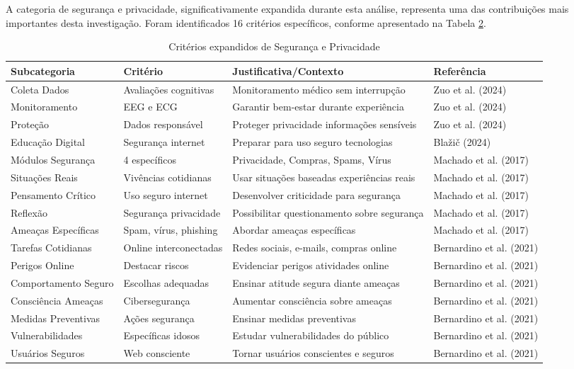 \begin{table}[H]
A categoria de segurança e privacidade, significativamente expandida durante esta análise, representa uma das contribuições mais importantes desta investigação. Foram identificados 16 critérios específicos, conforme apresentado na Tabela \ref{tab:seguranca_expandida}.

\begin{table}[H]
\centering
\caption{Critérios expandidos de Segurança e Privacidade}
\label{tab:seguranca_expandida}
\begin{tabular}{p{2.5cm}p{3.5cm}p{4.5cm}p{2.5cm}}
\hline
\textbf{Subcategoria} & \textbf{Critério} & \textbf{Justificativa/Contexto} & \textbf{Referência} \\ \hline
Coleta Dados & Avaliações cognitivas & Monitoramento médico sem interrupção & Zuo et al. (2024) \\
Monitoramento & EEG e ECG & Garantir bem-estar durante experiência & Zuo et al. (2024) \\
Proteção & Dados responsável & Proteger privacidade informações sensíveis & Zuo et al. (2024) \\
Educação Digital & Segurança internet & Preparar para uso seguro tecnologias & Blažič (2024) \\
Módulos Segurança & 4 específicos & Privacidade, Compras, Spams, Vírus & Machado et al. (2017) \\
Situações Reais & Vivências cotidianas & Usar situações baseadas experiências reais & Machado et al. (2017) \\
Pensamento Crítico & Uso seguro internet & Desenvolver criticidade para segurança & Machado et al. (2017) \\
Reflexão & Segurança privacidade & Possibilitar questionamento sobre segurança & Machado et al. (2017) \\
Ameaças Específicas & Spam, vírus, phishing & Abordar ameaças específicas & Machado et al. (2017) \\
Tarefas Cotidianas & Online interconectadas & Redes sociais, e-mails, compras online & Bernardino et al. (2021) \\
Perigos Online & Destacar riscos & Evidenciar perigos atividades online & Bernardino et al. (2021) \\
Comportamento Seguro & Escolhas adequadas & Ensinar atitude segura diante ameaças & Bernardino et al. (2021) \\
Consciência Ameaças & Cibersegurança & Aumentar consciência sobre ameaças & Bernardino et al. (2021) \\
Medidas Preventivas & Ações segurança & Ensinar medidas preventivas & Bernardino et al. (2021) \\
Vulnerabilidades & Específicas idosos & Estudar vulnerabilidades do público & Bernardino et al. (2021) \\
Usuários Seguros & Web consciente & Tornar usuários conscientes e seguros & Bernardino et al. (2021) \\
\hline
\end{tabular}
\end{table}


\end{table}
